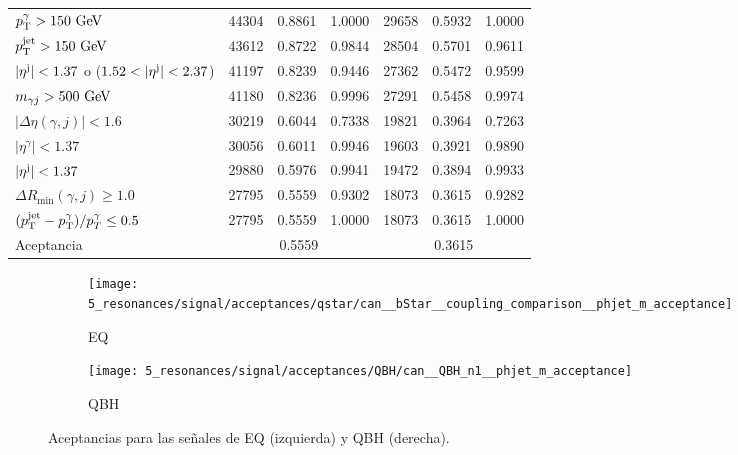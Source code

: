 \begin{table}[ht!]
{\begin{tabular}{lrrrrrr}
            $p_{\text{T}}^{\gamma} > 150~\text{GeV}$                                     & 44304 & 0.8861 & 1.0000               & 29658 & 0.5932 & 1.0000 \\
            $p_{\text{T}}^\text{jet} > 150~\text{GeV}$                                     & 43612 & 0.8722 & 0.9844               & 28504 & 0.5701 & 0.9611 \\
            $|\eta^{\text{j}}| < 1.37$ o ($1.52 < |\eta^{\text{j}}| < 2.37$)       & 41197 & 0.8239 & 0.9446               & 27362 & 0.5472 & 0.9599 \\
            $m_{\gamma j} > 500~\text{GeV}$                               & 41180 & 0.8236 & 0.9996               & 27291 & 0.5458 & 0.9974 \\
            $|\Delta\eta(\gamma,j)| < 1.6$                          & 30219 & 0.6044 & 0.7338               & 19821 & 0.3964 & 0.7263 \\
            $|\eta^{\gamma}| < 1.37$                                & 30056 & 0.6011 & 0.9946               & 19603 & 0.3921 & 0.9890 \\
            $|\eta^{\text{j}}| < 1.37$                                      & 29880 & 0.5976 & 0.9941               & 19472 & 0.3894 & 0.9933 \\
            $\Delta R_{\text{min}}(\gamma,j) \geq 1.0$              & 27795 & 0.5559 & 0.9302               & 18073 & 0.3615 & 0.9282 \\
            $(p_{\text{T}}^\text{jet} - p_{\text{T}}^{\gamma}) / p_{T}^{\gamma} \leq 0.5$           & 27795 & 0.5559 & 1.0000               & 18073 & 0.3615 & 1.0000 \\
            \midrule
            Aceptancia                                              & \multicolumn{3}{c}{0.5559}            & \multicolumn{3}{c}{0.3615} \\
            \bottomrule
        \end{tabular}
    }
    \label{tab:signals:acc_eff:acceptances}
\end{table}

\begin{figure}[ht!]
    \centering
    \begin{subfigure}[h]{0.49\linewidth}
        \centering
        \texttt{[image: 5\_resonances/signal/acceptances/qstar/can\_\_bStar\_\_coupling\_comparison\_\_phjet\_m\_acceptance]}
        \caption{\ac{EQ}}
        \label{fig:signals:acc_eff:acceptances:qstar}
    \end{subfigure}
    \hfill
    \begin{subfigure}[h]{0.49\linewidth}
        \centering
        \texttt{[image: 5\_resonances/signal/acceptances/QBH/can\_\_QBH\_n1\_\_phjet\_m\_acceptance]}
        \caption{\ac{QBH}}
        \label{fig:signals:acc_eff:acceptances:qbh}
    \end{subfigure}
    \caption{Aceptancias para las señales de \ac{EQ} (izquierda) y \ac{QBH} (derecha).}
    \label{fig:signals:acc_eff:acceptances}
\end{figure}


